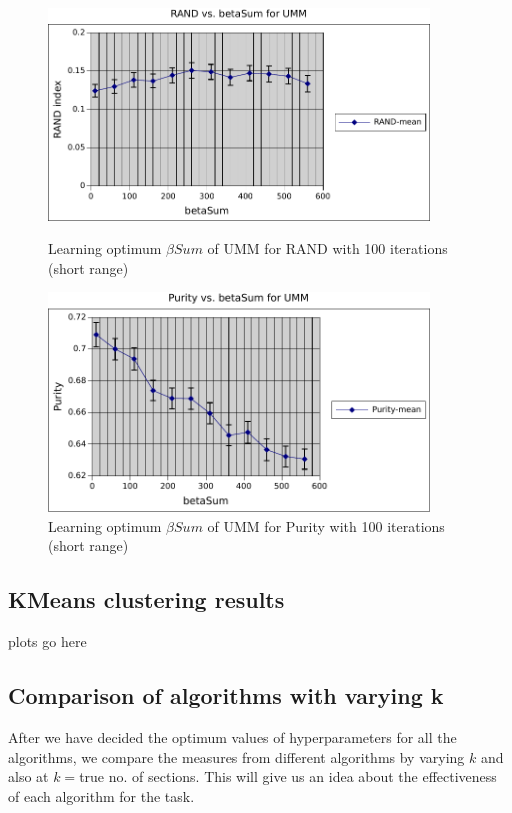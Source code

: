 \begin{figure}
    \centering
    \begin{minipage}{0.45\textwidth}
        \centering
        \includegraphics[width=0.9\textwidth]{fig/betaSum_rand_umm2.pdf}
        \caption{Learning optimum $\beta Sum$ of UMM for RAND with 100 iterations (short range)}
    \end{minipage}\hfill
    \begin{minipage}{0.45\textwidth}
        \centering
        \includegraphics[width=0.9\textwidth]{fig/betaSum_purity_umm2.pdf}
        \caption{Learning optimum $\beta Sum$ of UMM for Purity with 100 iterations (short range)}
    \end{minipage}
\end{figure}

\subsection{KMeans clustering results} plots go here
\subsection{Comparison of algorithms with varying k} After we have decided the optimum values of hyperparameters for all the algorithms, we compare the measures from different algorithms by varying $k$ and also at $k = $true no. of sections. This will give us an idea about the effectiveness of each algorithm for the task.

